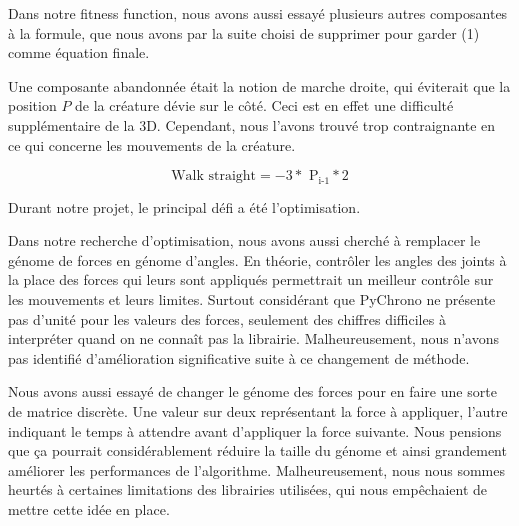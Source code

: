 \documentclass[journal, a4paper]{IEEEtran}
\begin{document}
Dans notre fitness function, nous avons aussi essayé plusieurs autres composantes à la formule, que nous avons par la suite choisi de supprimer pour garder (1) comme équation finale.

Une composante abandonnée était la notion de marche droite, qui éviterait que la position $P$ de la créature dévie sur le côté. Ceci est en effet une difficulté supplémentaire de la 3D. Cependant, nous l'avons trouvé trop contraignante en ce qui concerne les mouvements de la créature.

\begin{equation} 
\text{{Walk straight}} = -3 * \text{{ P}}_\text{i-1} * 2
\end{equation}


Durant notre projet, le principal défi a été l'optimisation.

Dans notre recherche d'optimisation, nous avons aussi cherché à remplacer le génome de forces en génome d'angles. En théorie, contrôler les angles des joints à la place des forces qui leurs sont appliqués permettrait un meilleur contrôle sur les mouvements et leurs limites. Surtout considérant que PyChrono ne présente pas d'unité pour les valeurs des forces, seulement des chiffres difficiles à interpréter quand on ne connaît pas la librairie. Malheureusement, nous n'avons pas identifié d'amélioration significative suite à ce changement de méthode.

Nous avons aussi essayé de changer le génome des forces pour en faire une sorte de matrice discrète. Une valeur sur deux représentant la force à appliquer, l'autre indiquant le temps à attendre avant d'appliquer la force suivante. Nous pensions que ça pourrait considérablement réduire la taille du génome et ainsi grandement améliorer les performances de l'algorithme. Malheureusement, nous nous sommes heurtés à certaines limitations des librairies utilisées, qui nous empêchaient de mettre cette idée en place.








\end{document}
